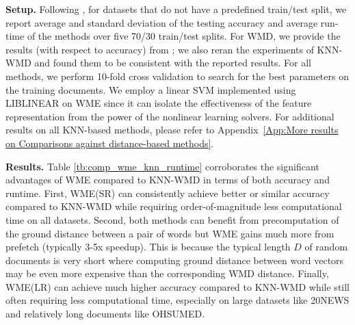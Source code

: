 \documentclass[11pt,a4paper]{article}
\newcommand{\1}{\boldsymbol{1}}
\begin{document}
\vskip0.05in
\noindent
\textbf{Setup.} Following \cite{kusner2015word,huang2016supervised}, for datasets that do not have a predefined train/test split, we report average and standard deviation of the testing accuracy and average run-time of the methods over five 70/30 train/test splits. For WMD, we provide the results (with respect to accuracy) from \cite{kusner2015word}; we also reran the experiments of KNN-WMD and found them to be  consistent with the reported results. For all methods, we perform 10-fold cross validation to search for the best parameters on the training documents. We employ a linear SVM implemented using LIBLINEAR \cite{fan2008liblinear} on WME since it can isolate the effectiveness of the feature representation from the power of the nonlinear learning solvers. For additional results on all KNN-based methods, please refer to Appendix~\ref{App:More results on Comparisons against distance-based methods}.

\vskip0.05in
\noindent
\textbf{Results.} Table \ref{tb:comp_wme_knn_runtime} corroborates the significant advantages of WME compared to KNN-WMD in terms of both accuracy and runtime. First, WME(SR) can consistently achieve better or similar accuracy compared to KNN-WMD while requiring order-of-magnitude less computational time on all datasets. Second, both methods can benefit from precomputation of the ground distance between a pair of words but WME gains much more from prefetch (typically 3-5x speedup). This is because the typical length $D$ of random documents is very short where computing ground distance between word vectors may be even more expensive than the corresponding WMD distance. Finally, WME(LR) can achieve much higher accuracy compared to KNN-WMD while still often requiring less computational time, especially on large datasets like 20NEWS and relatively long documents like OHSUMED. 
\end{document}
